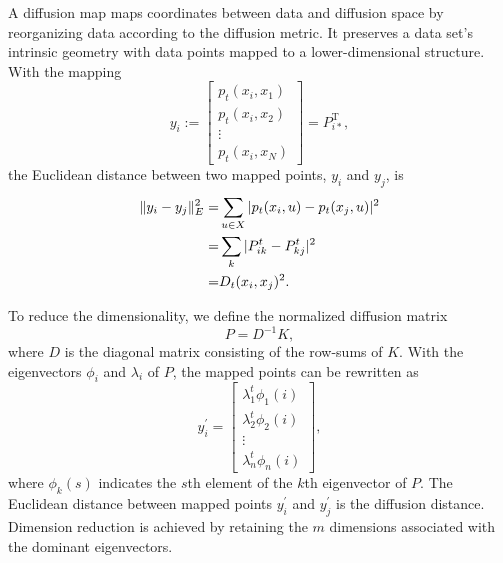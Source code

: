 A diffusion map maps coordinates between data and diffusion space by reorganizing data according to the diffusion metric. It preserves a data set's intrinsic geometry with data points mapped to a lower-dimensional structure. With the mapping
\begin{equation}
	y_i := \begin{bmatrix}
		p_t(x_i, x_{1}) \\
		p_t(x_i, x_{2}) \\
		\vdots \\
		p_t(x_i, x_{N})
	\end{bmatrix}=P_{i\ast}^{\operatorname{T}},
\end{equation}
the Euclidean distance between two mapped points, $y_i$ and $y_j$, is
\begin{align}
	\lVert y_i-y_j\rVert_E^2=&\sum_{u\in X} |p_t(x_i,u)-p_t(x_j,u)|^2\notag\\
	                        =&\sum_k |P_{ik}^t-P_{kj}^t|^2\notag\\
	                        =&D_t(x_i,x_j)^2.
\end{align}

To reduce the dimensionality, we define the normalized diffusion matrix
\begin{equation}
	P=D^{-1}K,
\end{equation}
where $D$ is the diagonal matrix consisting of the row-sums of $K$. With the eigenvectors $\phi_i$ and $\lambda_i$ of $P$, the mapped points can be rewritten as
\begin{equation}
	y_i^\prime=\begin{bmatrix}
		\lambda_1^t\phi_1(i) \\
		\lambda_2^t\phi_2(i) \\
		\vdots \\
		\lambda_n^t\phi_n(i)
	\end{bmatrix},
\end{equation}
where $\phi_k(s)$ indicates the $s$th element of the $k$th eigenvector of $P$. The Euclidean distance between mapped points $y_i^\prime$ and $y_j^\prime$ is the diffusion distance. Dimension reduction is achieved by retaining the $m$ dimensions associated with the dominant eigenvectors.